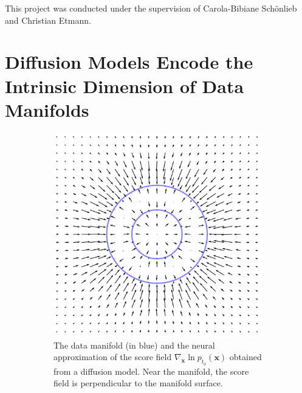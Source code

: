 This project was conducted under the supervision of Carola-Bibiane Sch\"onlieb and Christian Etmann.

\section{Diffusion Models Encode the Intrinsic Dimension of Data Manifolds}

\begin{figure}[h]
    \centering
    \begin{subfigure}[t]{0.45\linewidth}
        \centering
        \includegraphics[width=\linewidth]{Outline/figures/id-diff/score_field.png}
        \caption{The data manifold (in blue) and the neural approximation of the score field $\nabla_\textbf{x} \ln p_{t_0}(\textbf{x})$ obtained from a diffusion model. Near the manifold, the score field is perpendicular to the manifold surface.}
        \label{fig:score_field}
    \end{subfigure}
    \hspace{0.05\linewidth} %
    \begin{subfigure}[t]{0.45\linewidth}
        \vspace{-70mm} %
        \centering

\end{subfigure}
\end{figure}
